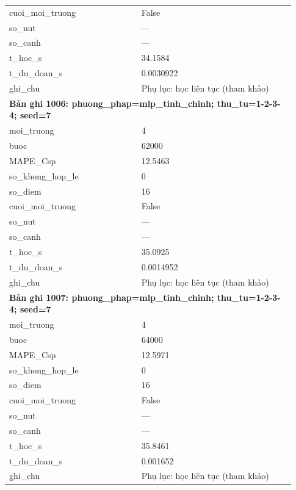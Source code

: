 \begin{longtable}{p{0.43\linewidth}p{0.50\linewidth}}
cuoi\_\allowbreak moi\_\allowbreak truong & False \\
so\_\allowbreak nut & — \\
so\_\allowbreak canh & — \\
t\_\allowbreak hoc\_\allowbreak s & 34.1584 \\
t\_\allowbreak du\_\allowbreak doan\_\allowbreak s & 0.0030922 \\
ghi\_\allowbreak chu & Phụ lục: học liên tục (tham khảo) \\
\midrule
\multicolumn{2}{p{0.95\linewidth}}{\textbf{Bản ghi 1006: phuong\_phap=mlp\_tinh\_chinh; thu\_tu=1-2-3-4; seed=7}} \\
moi\_\allowbreak truong & 4 \\
buoc & 62000 \\
MAPE\_\allowbreak Csp & 12.5463 \\
so\_\allowbreak khong\_\allowbreak hop\_\allowbreak le & 0 \\
so\_\allowbreak diem & 16 \\
cuoi\_\allowbreak moi\_\allowbreak truong & False \\
so\_\allowbreak nut & — \\
so\_\allowbreak canh & — \\
t\_\allowbreak hoc\_\allowbreak s & 35.0925 \\
t\_\allowbreak du\_\allowbreak doan\_\allowbreak s & 0.0014952 \\
ghi\_\allowbreak chu & Phụ lục: học liên tục (tham khảo) \\
\midrule
\multicolumn{2}{p{0.95\linewidth}}{\textbf{Bản ghi 1007: phuong\_phap=mlp\_tinh\_chinh; thu\_tu=1-2-3-4; seed=7}} \\
moi\_\allowbreak truong & 4 \\
buoc & 64000 \\
MAPE\_\allowbreak Csp & 12.5971 \\
so\_\allowbreak khong\_\allowbreak hop\_\allowbreak le & 0 \\
so\_\allowbreak diem & 16 \\
cuoi\_\allowbreak moi\_\allowbreak truong & False \\
so\_\allowbreak nut & — \\
so\_\allowbreak canh & — \\
t\_\allowbreak hoc\_\allowbreak s & 35.8461 \\
t\_\allowbreak du\_\allowbreak doan\_\allowbreak s & 0.001652 \\
ghi\_\allowbreak chu & Phụ lục: học liên tục (tham khảo) \\

\end{longtable}
